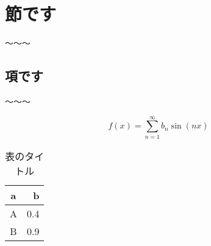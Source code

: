 \section{節です}

〜〜〜

\subsection{項です}

〜〜〜

\begin{equation}
	f(x) = \sum_{n=1}^{\infty} b_n \sin(nx)
\end{equation}

\begin{table}[htbp]
	\begin{center}
		\caption{表のタイトル}
	    \label{table:sample_table}
		\begin{tabular}{cr}
			\hline
			a & b\\
			\hline
			A & 0.4\\
			B & 0.9\\
			\hline
		\end{tabular}
	\end{center}
\end{table}


